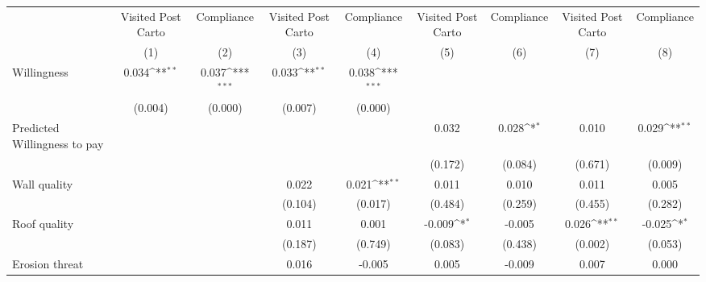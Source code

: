 {
\def\sym#1{\ifmmode^{#1}\else\(^{#1}\)\fi}
\begin{tabular}{l*{8}{c}}
\toprule
                &\multicolumn{1}{c}{Visited Post Carto}&\multicolumn{1}{c}{Compliance}&\multicolumn{1}{c}{Visited Post Carto}&\multicolumn{1}{c}{Compliance}&\multicolumn{1}{c}{Visited Post Carto}&\multicolumn{1}{c}{Compliance}&\multicolumn{1}{c}{Visited Post Carto}&\multicolumn{1}{c}{Compliance}\\
                &\multicolumn{1}{c}{(1)}         &\multicolumn{1}{c}{(2)}         &\multicolumn{1}{c}{(3)}         &\multicolumn{1}{c}{(4)}         &\multicolumn{1}{c}{(5)}         &\multicolumn{1}{c}{(6)}         &\multicolumn{1}{c}{(7)}         &\multicolumn{1}{c}{(8)}         \\
\midrule
Willingness     &    0.034\sym{**} &    0.037\sym{***}&    0.033\sym{**} &    0.038\sym{***}&                  &                  &                  &                  \\
                &  (0.004)         &  (0.000)         &  (0.007)         &  (0.000)         &                  &                  &                  &                  \\
Predicted Willingness to pay&                  &                  &                  &                  &    0.032         &    0.028\sym{*}  &    0.010         &    0.029\sym{**} \\
                &                  &                  &                  &                  &  (0.172)         &  (0.084)         &  (0.671)         &  (0.009)         \\
Wall quality    &                  &                  &    0.022         &    0.021\sym{**} &    0.011         &    0.010         &    0.011         &    0.005         \\
                &                  &                  &  (0.104)         &  (0.017)         &  (0.484)         &  (0.259)         &  (0.455)         &  (0.282)         \\
Roof quality    &                  &                  &    0.011         &    0.001         &   -0.009\sym{*}  &   -0.005         &    0.026\sym{**} &   -0.025\sym{*}  \\
                &                  &                  &  (0.187)         &  (0.749)         &  (0.083)         &  (0.438)         &  (0.002)         &  (0.053)         \\
Erosion threat  &                  &                  &    0.016         &   -0.005         &    0.005         &   -0.009         &    0.007         &    0.000         \\

\end{tabular}}
